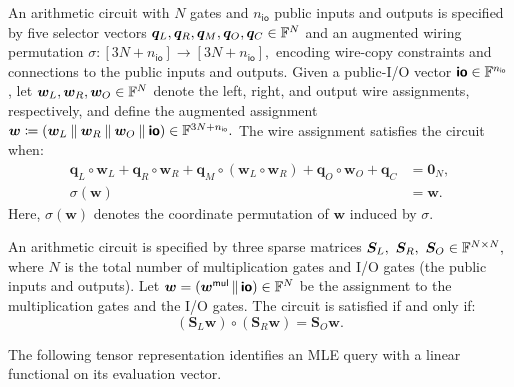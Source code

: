 \begin{definition}
\label{def:plonk}
An arithmetic circuit with \(N\) gates and \(n_{\mathsf{io}}\)
public inputs and outputs is specified by five selector vectors
\(
    \bm q_L,\bm q_R,\bm q_M,\bm q_O,\bm q_C
    \in{\mathbb{F}}^N
\)
and an augmented wiring permutation
\(
    \sigma:
    [3N+n_{\mathsf{io}}]
    \to
    [3N+n_{\mathsf{io}}],
\)
encoding wire-copy constraints and connections to the public inputs
and outputs.
Given a public-I/O vector
\(\bm{\mathsf{io}}\in{\mathbb{F}}^{n_{\mathsf{io}}}\), let
\(\bm w_L,\bm w_R,\bm w_O\in{\mathbb{F}}^N\) denote the left, right,
and output wire assignments, respectively, and define the
augmented assignment
\(
    \bm w
    \coloneqq
    (\bm w_L\mathbin{\|}\bm w_R\mathbin{\|}\bm w_O
    \mathbin{\|}\bm{\mathsf{io}})
    \in{\mathbb{F}}^{3N+n_{\mathsf{io}}}.
\)
The wire assignment satisfies the circuit when:
\begin{align}
    \bm q_L\circ\bm w_L
    +\bm q_R\circ\bm w_R
    +\bm q_M\circ(\bm w_L\circ\bm w_R)
    +\bm q_O\circ\bm w_O
    +\bm q_C
    &=\bm 0_N,
    \label{eq:plonk1}\\
    \sigma(\bm w)
    &=\bm w.
    \label{eq:plonk2}
\end{align}
Here,
\(\sigma(\bm w)\) denotes the coordinate permutation of
\(\bm w\) induced by \(\sigma\).
\end{definition}

\begin{definition}
\label{def:r1cs}
An arithmetic circuit is specified by three sparse matrices
\(
    \bm S_L,\ \bm S_R,\ \bm S_O \in \Field^{N\times N},
\)
where \(N\) is the total number of multiplication gates and I/O gates
(the public inputs and outputs). Let
\(
    \bm w = (\bm w^{\mathsf{mul}} \,\|\, \bm{\mathsf{io}}) \in {\mathbb{F}}^{N}
\)
be the assignment to the multiplication gates and the I/O gates.
The circuit is satisfied if and only if:
\[
    (\bm S_L \bm w) \circ (\bm S_R \bm w) = \bm S_O \bm w .
\]
\end{definition}

The following tensor representation identifies an MLE query with a
linear functional on its evaluation vector.

